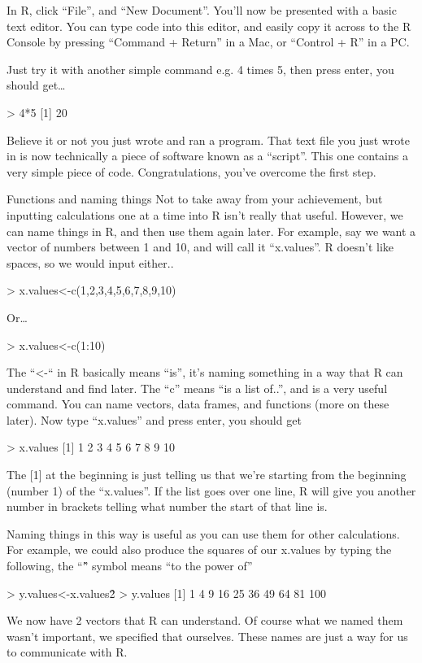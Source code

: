 \documentclass{article}
\begin{document}
In R, click “File”, and “New Document”. You’ll now be presented with a basic text editor. You can type code into this editor, and easily copy it across to the R Console by pressing “Command + Return” in a Mac, or “Control + R” in a PC. 

Just try it with another simple command e.g. 4 times 5, then press enter, you should get…

> 4*5
[1] 20

Believe it or not you just wrote and ran a program. That text file you just wrote in is now technically a piece of software known as a “script”. This one contains a very simple piece of code. Congratulations, you’ve overcome the first step. 



Functions and naming things
Not to take away from your achievement, but inputting calculations one at a time into R isn’t really that useful. However, we can name things in R, and then use them again later. For example, say we want a vector of numbers between 1 and 10, and will call it “x.values”. R doesn’t like spaces, so we would input either..

> x.values<-c(1,2,3,4,5,6,7,8,9,10)

Or…

> x.values<-c(1:10)

The “<-“ in R basically means “is”, it’s naming something in a way that R can understand and find later. The “c” means “is a list of..”, and is a very useful command. You can name vectors, data frames, and functions (more on these later). Now type “x.values” and press enter, you should get

> x.values
[1]  1  2  3  4  5  6  7  8  9 10

The [1] at the beginning is just telling us that we’re starting from the beginning (number 1) of the “x.values”. If the list goes over one line, R will give you another number in brackets telling what number the start of that line is.

Naming things in this way is useful as you can use them for other calculations. For example, we could also produce the squares of our x.values by typing the following, the “\^” symbol means “to the power of”

> y.values<-x.values\^2
> y.values
[1]   1   4   9  16  25  36  49  64  81 100

We now have 2 vectors that R can understand. Of course what we named them wasn’t important, we specified that ourselves. These names are just a way for us to communicate with R. 
\end{document}
